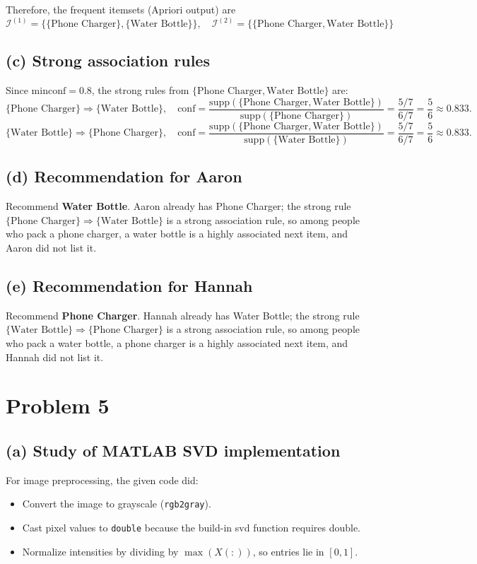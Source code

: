 \documentclass[fleqn]{article}
\begin{document}
    \noindent Therefore, the frequent itemsets (Apriori output) are
    \[
    \mathcal{I}^{(1)}=\big\{\{\text{Phone Charger}\},\{\text{Water Bottle}\}\big\},\quad
    \mathcal{I}^{(2)}=\big\{\{\text{Phone Charger},\text{Water Bottle}\}\big\}
    \]
    \subsection{(c) Strong association rules}
    \noindent Since $\mathrm{minconf}=0.8$, the strong rules from
    $\{\text{Phone Charger},\text{Water Bottle}\}$ are:
    \[
    \{\text{Phone Charger}\}\Rightarrow\{\text{Water Bottle}\},
    \quad
    \mathrm{conf}
    =\frac{\mathrm{supp}(\{\text{Phone Charger},\text{Water Bottle}\})}
    {\mathrm{supp}(\{\text{Phone Charger}\})}
    =\frac{5/7}{6/7}
    =\frac{5}{6}\approx 0.833.
    \]
    \[
    \{\text{Water Bottle}\}\Rightarrow\{\text{Phone Charger}\},
    \quad
    \mathrm{conf}
    =\frac{\mathrm{supp}(\{\text{Phone Charger},\text{Water Bottle}\})}
    {\mathrm{supp}(\{\text{Water Bottle}\})}
    =\frac{5/7}{6/7}
    =\frac{5}{6}\approx 0.833.
    \]

    \subsection{(d) Recommendation for Aaron}
    \noindent Recommend \textbf{Water Bottle}. Aaron already has Phone Charger; the strong rule
    $\{\text{Phone Charger}\}\Rightarrow\{\text{Water Bottle}\}$ is a strong association rule, so among people who pack a phone charger, a water bottle is a highly associated next item, and Aaron did not list it.

    \subsection{(e) Recommendation for Hannah}
    \noindent Recommend \textbf{Phone Charger}. Hannah already has Water Bottle; the strong rule
    $\{\text{Water Bottle}\}\Rightarrow\{\text{Phone Charger}\}$ is a strong association rule, so among people who pack a water bottle, a phone charger is a highly associated next item, and Hannah did not list it.

    \section{Problem 5}
    \subsection{(a) Study of MATLAB SVD implementation}
    For image preprocessing, the given code did:
    \begin{itemize}
        \item Convert the image to grayscale (\texttt{rgb2gray}).
        \item Cast pixel values to \texttt{double} because the build-in svd function requires double.
        \item Normalize intensities by dividing by $\max(X(:))$, so entries lie in $[0,1]$.
    \end{itemize}
\end{document}
